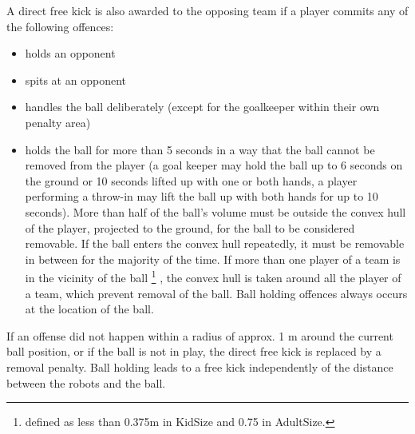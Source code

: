
\bigskip


A direct free kick is also awarded to the opposing team if a player commits
any of the following %
offences:

\begin{itemize}
\item holds an opponent
\item spits at an opponent
\item handles the ball deliberately
    (except for the goalkeeper within their own penalty area)
\item {}holds the ball for more than 5 seconds in a way that the
  ball cannot be removed from the player (a goal keeper may hold the ball up to
  6 seconds on the ground or 10 seconds lifted up with one or both hands,
    a player performing a throw-in may lift the ball up with both hands
    for up to 10 seconds). More than half of the ball's volume must be outside
  the convex hull of the player, projected to the ground, for the ball to be
  considered removable. If the ball enters the convex hull repeatedly, it must
  be removable in between for the majority of the time. If more than one player
  of a team is in the vicinity of the ball
    \footnote{defined as less than 0.375m in KidSize and 0.75 in AdultSize.}
  , the convex hull is taken around all
  the player of a team, which prevent removal of the ball.
  Ball holding offences always occurs at the location of the ball.
\end{itemize}

\bigskip

If an offense did not happen within a radius of approx. 1 m
around the current ball position, or if the ball is not in play,
the direct free kick is replaced by a removal penalty.
Ball holding leads to a free kick independently of the distance between
  the robots and the ball.

